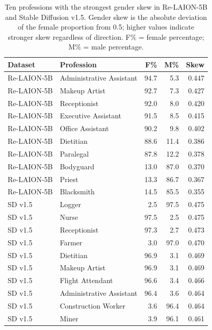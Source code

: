 \begin{table}[htbp]
	\centering
	\small
	\begin{tabular}{llrrr}
		\toprule
		\textbf{Dataset} & \textbf{Profession}      &
		\textbf{F\%}     & \textbf{M\%}             & \textbf{Skew}                \\
		\midrule
		Re-LAION-5B      & Administrative Assistant & 94.7          & 5.3  & 0.447 \\
		Re-LAION-5B      & Makeup Artist            & 92.7          & 7.3  & 0.427 \\
		Re-LAION-5B      & Receptionist             & 92.0          & 8.0  & 0.420 \\
		Re-LAION-5B      & Executive Assistant      & 91.5          & 8.5  & 0.415 \\
		Re-LAION-5B      & Office Assistant         & 90.2          & 9.8  & 0.402 \\
		Re-LAION-5B      & Dietitian                & 88.6          & 11.4 & 0.386 \\
		Re-LAION-5B      & Paralegal                & 87.8          & 12.2 & 0.378 \\
		Re-LAION-5B      & Bodyguard                & 13.0          & 87.0 & 0.370 \\
		Re-LAION-5B      & Priest                   & 13.3          & 86.7 & 0.367 \\
		Re-LAION-5B      & Blacksmith               & 14.5          & 85.5 & 0.355 \\
		\midrule
		SD v1.5          & Logger                   & 2.5           & 97.5 & 0.475 \\
		SD v1.5          & Nurse                    & 97.5          & 2.5  & 0.475 \\
		SD v1.5          & Receptionist             & 97.3          & 2.7  & 0.473 \\
		SD v1.5          & Farmer                   & 3.0           & 97.0 & 0.470 \\
		SD v1.5          & Dietitian                & 96.9          & 3.1  & 0.469 \\
		SD v1.5          & Makeup Artist            & 96.9          & 3.1  & 0.469 \\
		SD v1.5          & Flight Attendant         & 96.6          & 3.4  & 0.466 \\
		SD v1.5          & Administrative Assistant & 96.4          & 3.6  & 0.464 \\
		SD v1.5          & Construction Worker      & 3.6           & 96.4 & 0.464 \\
		SD v1.5          & Miner                    & 3.9           & 96.1 & 0.461 \\
		\bottomrule
	\end{tabular}
	\caption{Ten professions with the strongest gender skew
		in Re-LAION-5B and Stable Diffusion v1.5. Gender
		skew is the absolute deviation of the female proportion
		from 0.5; higher values indicate stronger skew
		regardless of direction. F\% = female percentage;
		M\% = male percentage.}
	\label{tab:top_biased_professions_gender}
\end{table}

